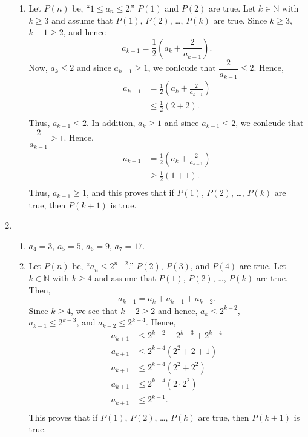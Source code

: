 \begin{enumerate}
\begin{enumerate}
\item Let $P \left( n \right)$ be, ``$1 \leq a_n  \leq 2$.'' $P \left( 1 \right)$ and  
$P \left( 2 \right)$ are true.  Let $k \in \mathbb{N}$ with $k \geq 3$ and assume that 
$P \left( 1 \right)$, $P \left( 2 \right)$, \ldots, $P \left( k \right)$ are true.  Since 
$k \geq 3$, $k -1 \geq 2$, and hence
\[
a_{k + 1} = \frac{1}{2} \left( a_k + \frac{2}{a_{k-1}} \right).
\]
Now, $a_k \leq 2$ and since $a_{k-1} \geq 1$, we conlcude that $\dfrac{2}{a_{k-1}} \leq 2$.  Hence,
\[
\begin{aligned}
a_{k + 1} &= \frac{1}{2} \left( a_k + \frac{2}{a_{k-1}} \right) \\
          & \leq \frac{1}{2} \left( 2 + 2 \right). \\
\end{aligned}
\]
Thus, $a_{k+1} \leq 2$.  In addition, $a_k \geq 1$ and since $a_{k-1} \leq 2$, we conlcude that $\dfrac{2}{a_{k-1}} \geq 1$.  Hence,
\[
\begin{aligned}
a_{k + 1} &= \frac{1}{2} \left( a_k + \frac{2}{a_{k-1}} \right) \\
          & \geq \frac{1}{2} \left( 1 + 1 \right). \\
\end{aligned}
\]
Thus, $a_{k+1} \geq 1$, and this proves that if $P \left( 1 \right)$, $P \left( 2 \right)$, \ldots, $P \left( k \right)$ are true,  then $P \left( k + 1\right)$ is true.
\end{enumerate}



\item \begin{enumerate}
\item $a_4 = 3$, $a_5 =5$, $a_6 =9$, $a_7 =17$.

\item Let $P \left( n \right)$ be, ``$a_n \leq 2^{n-2}$.''  $P \left( 2 \right)$, 
$P \left( 3 \right)$, and $P \left( 4 \right)$ are true.  Let 
$k \in \mathbb{N}$ with $k \geq 4$ and assume that $P \left( 1 \right)$, $P \left( 2 \right)$, \ldots, $P \left( k \right)$ are true.  Then,
\[
a_{k+1} = a_k + a_{k-1} + a_{k-2}.
\]
Since $k \geq 4$, we see that $k - 2 \geq 2$ and hence, $a_k \leq 2^{k-2}$, \\
$a_{k-1} \leq 2^{k-3}$, and $a_{k-2} \leq 2^{k-4}$. Hence,
\[
\begin{aligned}
a_{k+1} & \leq 2^{k-2} + 2^{k-3} + 2^{k-4} \\
a_{k+1} & \leq 2^{k-4} \left( 2^2 + 2 + 1 \right) \\
a_{k+1} & \leq 2^{k-4} \left( 2^2 + 2^2 \right) \\
a_{k+1} & \leq 2^{k-4} \left( 2 \cdot 2^2 \right) \\
a_{k+1} & \leq 2^{k-1}. \\
\end{aligned}
\]
This proves that if $P \left( 1 \right)$, $P \left( 2 \right)$, \ldots, $P \left( k \right)$ are true,  then $P \left( k + 1\right)$ is true.
\end{enumerate}




\end{enumerate}

